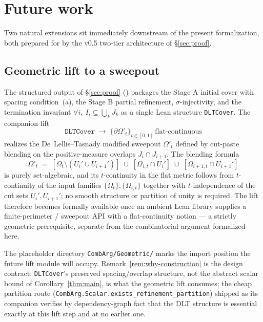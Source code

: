 \section{Future work}
\label{sec:future}

Two natural extensions sit immediately downstream of the present
formalization, both prepared for by the v0.5 two-tier architecture
of \S\ref{sec:proof}.

\subsection{Geometric lift to a sweepout}
\label{sec:future-lift}

The structured output of \S\ref{sec:proof}
() packages the Stage A
initial cover with spacing condition~(a), the Stage B partial
refinement, $\sigma$-injectivity, and the termination invariant
$\forall i,\ I_i \subseteq \bigcup_k J_k$ as a single Lean structure
\texttt{DLTCover}. The companion lift
\[
  \texttt{DLTCover}\;\longrightarrow\;
  \{\partial \Omega'_t\}_{t \in [0,1]}\ \text{flat-continuous}
\]
realizes the De~Lellis--Tasnady modified sweepout
$\Omega'_t$ defined by cut-paste blending on the positive-measure
overlaps $J_i \cap J_{i+1}$. The blending formula
\[
  \Omega'_t \;=\; [\Omega_t \setminus (U_i' \cup U_{i+1}')]
   \;\cup\; [\Omega_{i,t} \cap U_i']
   \;\cup\; [\Omega_{i+1,t} \cap U_{i+1}']
\]
is purely set-algebraic, and its $t$-continuity in the flat metric
follows from $t$-continuity of the input families
$\{\Omega_t\}, \{\Omega_{i,t}\}$ together with $t$-independence of
the cut sets $U_i', U_{i+1}'$; no smooth structure or partition of
unity is required. The lift therefore becomes formally available
once an ambient Lean library supplies a finite-perimeter / sweepout
API with a flat-continuity notion --- a strictly geometric
prerequisite, separate from the combinatorial argument formalized
here.

The placeholder directory \texttt{CombArg/Geometric/} marks the
import position the future lift module will occupy.
Remark~\ref{rem:why-construction} is the design contract:
\texttt{DLTCover}'s preserved spacing/overlap structure, not the
abstract scalar bound of Corollary~\ref{thm:main}, is what the
geometric lift consumes; the cheap partition route
(\texttt{CombArg.Scalar.exists\_refinement\_partition}) shipped as
its companion verifies by dependency-graph fact that the DLT
structure is essential exactly at this lift step and at no earlier
one.

